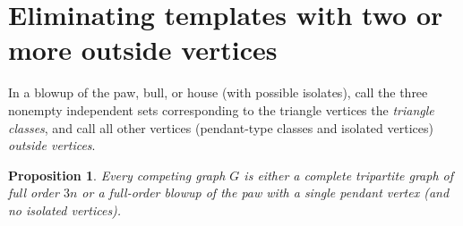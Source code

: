 \documentclass[10pt]{article}
\newtheorem{proposition}[theorem]{Proposition}
\begin{document}
\section{Eliminating templates with two or more outside vertices}

In a blowup of the paw, bull, or house (with possible isolates), call the three nonempty independent sets corresponding to the triangle vertices the \emph{triangle classes}, and call all other vertices (pendant-type classes and isolated vertices) \emph{outside vertices}.

\begin{proposition}\label{prop:outside}
Every competing graph $G$ is either a complete tripartite graph of full order $3n$ or a full-order blowup of the paw with a single pendant vertex (and no isolated vertices).
\end{proposition}
\end{document}

